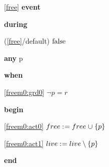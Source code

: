 \noindent \ref{free}  \textbf{event}
\begin{block}
  \item   \textbf{during}
  \begin{block}
  \item[ (\ref{free}/default) ]\sout{$\text{false} $} %
  \end{block}
  \item   \textbf{any} p
  \item   \textbf{when}
  \begin{block}
  \item[ \eqref{freem0:grd0} ]{$\neg p = r $} %
  \end{block}
  \item   \textbf{begin}
  \begin{block}
  \item[ \eqref{freem0:act0} ]{$free \mathrel{:\mkern1mu=} free \mathbin{\mkern1mu\cup\mkern1mu} \{ p \} $} %
  \item[ \eqref{freem0:act1} ]{$live \mathrel{:\mkern1mu=} live \setminus \{ p \} $} %
  \end{block}
  \item   \textbf{end} \\
\end{block}
